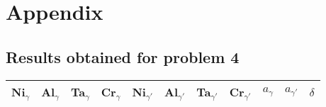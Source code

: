 \section{Appendix}
\label{appendix}

\subsection{Results obtained for problem 4}
\begin{table}[H]
    \centering
    \begin{tabular}{rrrrrrrrrrr}
        \multicolumn{1}{c}{Ni$_\gamma$} & \multicolumn{1}{c}{Al$_\gamma$} & \multicolumn{1}{c}{Ta$_\gamma$} & \multicolumn{1}{c}{Cr$_\gamma$} & \multicolumn{1}{c}{Ni$_{\gamma'}$} & \multicolumn{1}{c}{Al$_{\gamma'}$} & \multicolumn{1}{c}{Ta$_{\gamma'}$} & \multicolumn{1}{c}{Cr$_{\gamma'}$} & \multicolumn{1}{c}{$a_\gamma$} & \multicolumn{1}{c}{$a_{\gamma'}$} & \multicolumn{1}{c}{$\delta$} \\ \hline \hline

\end{tabular}
\end{table}
